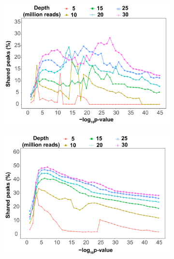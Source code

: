 \begin{figure}[htbp]
\centering
\begin{subfigure}{0.50\textwidth}
\centering
\includegraphics[width=\textwidth]{./Results1/pdfs/ATAC_Core_fresh_CTL2_CD4_shared_peaks_IDR_vs_pval}
\caption{\textbf{}}
\end{subfigure}%
\begin{subfigure}{0.50\textwidth}
\centering
\includegraphics[width=\textwidth]{./Results1/pdfs/ATAC_Core_fresh_CTL2_CD14_shared_peaks_IDR_vs_pval}
\caption{\textbf{}}
\end{subfigure} \\
\begin{subfigure}{0.65\textwidth}
\centering

\end{subfigure}
\end{figure}
